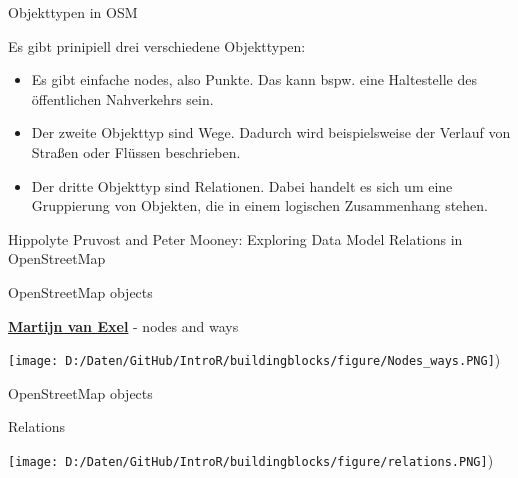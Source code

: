 \documentclass[ignorenonframetext,]{beamer}
\providecommand{\tightlist}{%
  \setlength{\itemsep}{0pt}\setlength{\parskip}{0pt}}
\begin{document}
\begin{frame}{Objekttypen in OSM}

\begin{block}{Es gibt prinipiell drei verschiedene Objekttypen:}

\begin{itemize}
\tightlist
\item
  Es gibt einfache nodes, also Punkte. Das kann bspw. eine Haltestelle
  des öffentlichen Nahverkehrs sein.
\item
  Der zweite Objekttyp sind Wege. Dadurch wird beispielsweise der
  Verlauf von Straßen oder Flüssen beschrieben.
\item
  Der dritte Objekttyp sind Relationen. Dabei handelt es sich um eine
  Gruppierung von Objekten, die in einem logischen Zusammenhang stehen.
\end{itemize}

Hippolyte Pruvost and Peter Mooney: Exploring Data Model Relations in
OpenStreetMap

\end{block}

\end{frame}

\begin{frame}{OpenStreetMap objects}

\begin{block}{\href{https://www.slideshare.net/mvexel/openstreetmap-9819440}{\textbf{Martijn
van Exel}} - nodes and ways}

\texttt{[image: D:/Daten/GitHub/IntroR/buildingblocks/figure/Nodes\_ways.PNG]})

\end{block}

\end{frame}

\begin{frame}{OpenStreetMap objects}

\begin{block}{Relations}

\texttt{[image: D:/Daten/GitHub/IntroR/buildingblocks/figure/relations.PNG]})

\end{block}

\end{frame}
\end{document}
